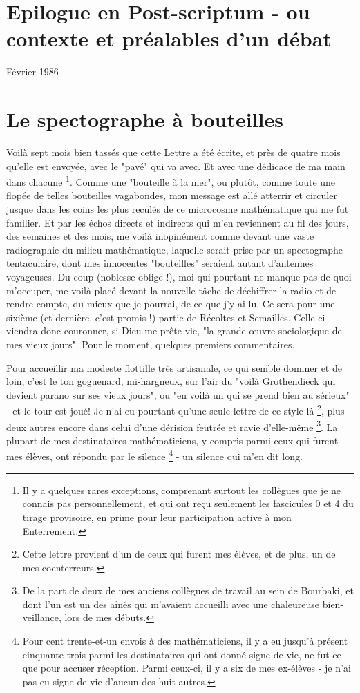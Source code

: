 \section*{Epilogue en Post-scriptum - ou contexte et préalables d'un débat}

\hfill Février 1986

\section{Le spectographe à bouteilles}

Voilà sept mois bien tassés que cette Lettre a été écrite, et près de quatre mois qu'elle est envoyée, avec le "pavé" qui va avec. Et avec une dédicace de ma main dans chacune \footnote{Il y a quelques rares exceptions, comprenant surtout les collègues que je ne connais pas personnellement, et qui ont reçu seulement les fascicules 0 et 4 du tirage provisoire, en prime pour leur participation active à mon Enterrement.}. Comme une "bouteille à la mer", ou plutôt, comme toute une flopée de telles bouteilles vagabondes, mon message est allé atterrir et circuler jusque dans les coins les plus reculés de ce microcosme mathématique qui me fut familier. Et par les échos directs et indirects qui m'en reviennent au fil des jours, des semaines et des mois, me voilà inopinément comme devant une vaste radiographie du milieu mathématique, laquelle serait prise par un spectographe tentaculaire, dont mes innocentes "bouteilles" seraient autant d'antennes voyageuses. Du coup (noblesse oblige !), moi qui pourtant ne manque pas de quoi m'occuper, me voilà placé devant la nouvelle tâche de déchiffrer la radio et de rendre compte, du mieux que je pourrai, de ce que j'y ai lu. Ce sera pour une sixième (et dernière, c'est promis !) partie de Récoltes et Semailles. Celle-ci viendra donc couronner, si Dieu me prête vie, "la grande œuvre sociologique de mes vieux jours". Pour le moment, quelques premiers commentaires.

Pour accueillir ma modeste flottille très artisanale, ce qui semble dominer et de loin, c'est le ton goguenard, mi-hargneux, sur l'air du "voilà Grothendieck qui devient parano sur ses vieux jours", ou "en voilà un qui se prend bien au sérieux" - et le tour est joué! Je n'ai eu pourtant qu'une seule lettre de ce style-là \footnote{Cette lettre provient d'un de ceux qui furent mes élèves, et de plus, un de mes coenterreurs.}, plus deux autres encore dans celui d'une dérision feutrée et ravie d'elle-même \footnote{De la part de deux de mes anciens collègues de travail au sein de Bourbaki, et dont l'un est un des aînés qui m'avaient accueilli avec une chaleureuse bien-veillance, lors de mes débuts.}. La plupart de mes destinataires mathématiciens, y compris parmi ceux qui furent mes élèves, ont répondu par le silence \footnote{Pour cent trente-et-un envois à des mathématiciens, il y a eu jusqu'à présent cinquante-trois parmi les destinataires qui ont donné signe de vie, ne fut-ce que pour accuser réception. Parmi ceux-ci, il y a six de mes ex-élèves - je n'ai pas eu signe de vie d'aucun des huit autres.} - un silence qui m'en dit long.

